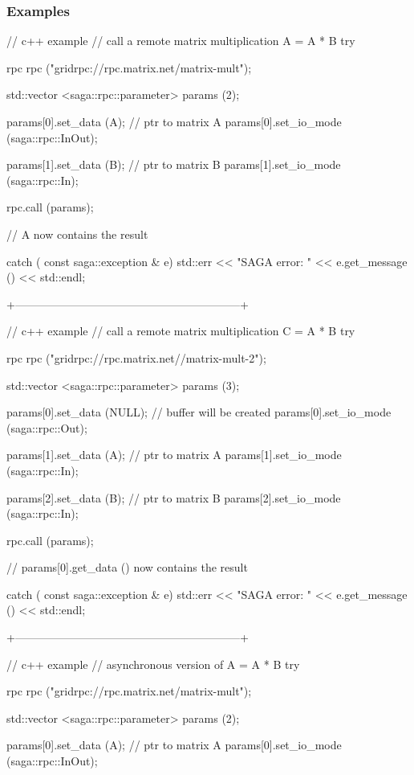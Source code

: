  
 \subsubsection{Examples}
 
 \begin{mycode}
  // c++ example
  // call a remote matrix multiplication A = A * B
  try 
  {
    rpc rpc ("gridrpc://rpc.matrix.net/matrix-mult");
 
    std::vector <saga::rpc::parameter> params (2);
 
    params[0].set_data (A); // ptr to matrix A
    params[0].set_io_mode (saga::rpc::InOut);
 
    params[1].set_data (B); // ptr to matrix B
    params[1].set_io_mode (saga::rpc::In);
 
    rpc.call (params);
 
    // A now contains the result
  }
  catch ( const saga::exception & e)
  {
    std::err << "SAGA error: " 
             << e.get_message () 
             << std::endl;
  }
 
  +------------------------------------------------------------+
 
  // c++ example
  // call a remote matrix multiplication C = A * B
  try 
  {
    rpc rpc ("gridrpc://rpc.matrix.net//matrix-mult-2");
 
    std::vector <saga::rpc::parameter> params (3);
 
    params[0].set_data (NULL); // buffer will be created
    params[0].set_io_mode (saga::rpc::Out);
 
    params[1].set_data (A); // ptr to matrix A
    params[1].set_io_mode (saga::rpc::In);
 
    params[2].set_data (B); // ptr to matrix B
    params[2].set_io_mode (saga::rpc::In);
 
    rpc.call (params);
 
    // params[0].get_data () now contains the result
  }
  catch ( const saga::exception & e)
  {
    std::err << "SAGA error: " 
             << e.get_message () 
             << std::endl;
  }
 
  +------------------------------------------------------------+
 
  // c++ example
  // asynchronous version of A = A * B
  try 
  {
    rpc rpc ("gridrpc://rpc.matrix.net/matrix-mult");
 
    std::vector <saga::rpc::parameter> params (2);
 
    params[0].set_data (A); // ptr to matrix A
    params[0].set_io_mode (saga::rpc::InOut);
 
}
\end{mycode}
